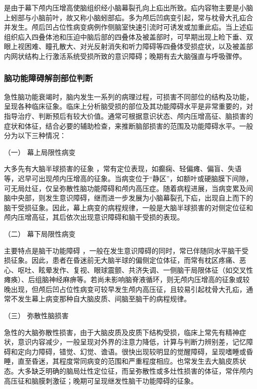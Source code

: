 是由于幕下颅内压增高使脑组织经小脑幕裂孔向上疝出所致。疝内容物主要是小脑上蚓部与小脑前叶，故又称小脑蚓部疝。多为颅后凹病变引起，常与枕骨大孔疝合并发生。颅后凹占位性病变病例作侧脑室快速引流时可诱发或加重此疝。当上述疝组织疝入四叠体池和压迫中脑后部的四叠体及被盖部时，可早期出现上睑下垂、双眼上视困难、瞳孔散大、对光反射消失和听力障碍等四叠体受损症状，以及被盖部内网状结构上行激活系统受损所致的意识障碍；晚期有去大脑强直与呼吸骤停。

\subsubsection{脑功能障碍解剖部位判断}

急性脑功能衰竭时，脑内发生一系列的病理过程，可损害不同部位的结构及功能，呈现各种临床征象。临床上分析脑受损的部位及其功能障碍水平是非常重要的，对指导治疗、判断预后有较大价值。通常可根据意识状态、颅内压增高征、脑损害的症状和体征，结合必要的辅助检查，来推断脑部损害的范围及功能障碍水平。一般分为以下三种情况：

\hypertarget{text00067.htmlux5cux23CHP3-1-2-2-1}{}
（一） 幕上局限性病变

大多先有大脑半球损害的征象
，常有定位表现，如癫痫、轻偏瘫、偏盲、失语等，迟早可出现颅内压增高的征象。当病变位于“静区”，如额叶或硬脑膜下间隙，可无局灶征，仅呈弥散性脑功能障碍和颅内高压症。随着病程进展，当病变累及间脑中央部，则发生意识障碍，继而进一步发展为小脑幕裂孔下疝，出现自上而下的脑干受损征象。因此，幕上病变的病程规律，一般是大脑半球损害的对侧定位征和颅内压增高征，其后依次出现意识障碍和脑干受损的表现。

\hypertarget{text00067.htmlux5cux23CHP3-1-2-2-2}{}
（二） 幕下局限性病变

主要特点是脑干功能障碍
，一般在发生意识障碍的同时，常已伴随同水平脑干受损征象。因此，患者在昏迷前无大脑半球的偏侧定位体征，而常有枕区疼痛、恶心、呕吐、眩晕发作、复视、眼球震颤、共济失调、一侧脑干局限体征（如交叉性瘫痪）、后组脑神经麻痹等。若尚未影响脑脊液循环，则无颅内压增高的征象或较晚出现，但颅后凹占位性病变可较早发生颅内高压征，且较易引起枕骨大孔疝，通常不发生幕上病变那种自大脑皮质、间脑至脑干的病程规律。

\hypertarget{text00067.htmlux5cux23CHP3-1-2-2-3}{}
（三） 弥散性脑损害

急性的大脑弥散性损害，由于大脑皮质及皮质下结构受损，临床上常先有精神症状，意识内容减少，一般呈现对外界的注意力降低，计算与判断力辨别差，记忆障碍和定向力障碍，错觉、幻觉、谵语。很快出现较明显的觉醒障碍，呈现嗜睡或昏睡，直至昏迷，其程度常同病变的范围和严重程度相应。也常发生去大脑皮质状态。大多缺乏明确的脑局灶性定位征，而呈弥散性或多灶性损害的体征，常伴颅内高压征和脑膜刺激征；晚期可呈现继发性脑干功能障碍的征象。

